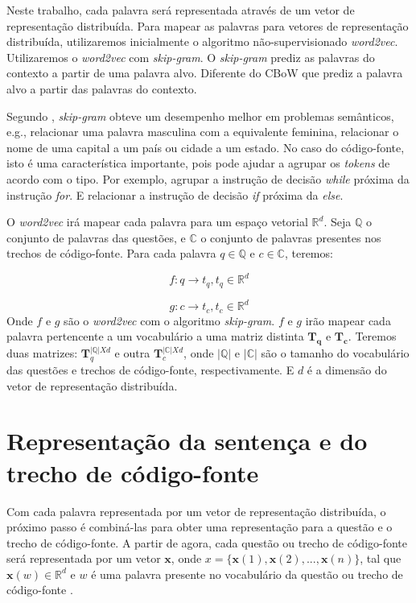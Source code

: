 Neste trabalho, cada palavra será representada através de um vetor de representação distribuída. Para mapear as palavras para vetores de representação distribuída, utilizaremos inicialmente o algoritmo não-supervisionado \textit{word2vec}. Utilizaremos o \textit{word2vec} com \textit{skip-gram}. O \textit{skip-gram} prediz as palavras do contexto a partir de uma palavra alvo. Diferente do CBoW que prediz a palavra alvo a partir das palavras do contexto. 

Segundo \cite{mikolov2013distributed}, \textit{skip-gram} obteve um desempenho melhor em problemas semânticos, e.g., relacionar uma palavra masculina com a equivalente feminina, relacionar o nome de uma capital a um país ou cidade a um estado. No caso do código-fonte, isto é uma característica importante, pois pode ajudar a agrupar os \textit{tokens} de acordo com o tipo. Por exemplo, agrupar a instrução de decisão \textit{while} próxima da instrução \textit{for}. E relacionar a instrução de decisão \textit{if} próxima da \textit{else}.

O \textit{word2vec} irá mapear cada palavra para um espaço vetorial $\mathbb{R}^{d}$. Seja $\mathbb{Q}$ o conjunto de palavras das questões, e $\mathbb{C}$ o conjunto de palavras presentes nos trechos de código-fonte. Para cada palavra ${q} \in \mathbb{Q}$ e ${c} \in \mathbb{C}$, teremos:

\begin{equation}
    f: {q} \rightarrow t_{q}, t_{q} \in \mathbb{R}^{d}
\end{equation}

\begin{equation}
    g: {c} \rightarrow t_{c}, t_{c} \in \mathbb{R}^{d}
\end{equation}
Onde $f$ e $g$ são o \textit{word2vec} com o algoritmo \textit{skip-gram}. $f$ e $g$ irão mapear cada palavra pertencente a um vocabulário a uma matriz distinta $\bm{T_{q}}$ e $\bm{T_{c}}$.
Teremos duas matrizes: $\bm{T}_{q}^{|\mathbb{Q}| X d}$ e outra $\bm{T}_{c}^{|\mathbb{C}| X d}$, onde $|\mathbb{Q}|$ e $|\mathbb{C}|$ são o tamanho do vocabulário das questões e trechos de código-fonte, respectivamente. E $d$ é a dimensão do vetor de representação distribuída.

\section{Representação da sentença e do trecho de código-fonte}

Com cada palavra representada por um vetor de representação distribuída, o próximo passo é combiná-las para obter uma representação para a questão e o trecho de código-fonte. A partir de agora, cada questão ou trecho de código-fonte será representada por um vetor $\bm{x}$, onde $x = \{ \bm{x}(1), \bm{x}(2), . . ., \bm{x}(n) \}$, tal que $\bm{x}(w) \in \mathbb{R}^{d}$ e $w$ é uma palavra presente no vocabulário da questão ou trecho de código-fonte \citep{cambronero-deep-learning-code-search:2019}. 

